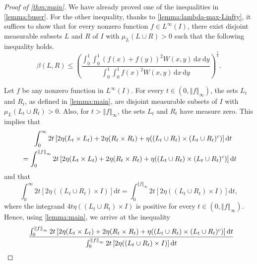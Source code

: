 \documentclass[12pt,a4paper,bold]{thesis}
\theoremstyle{definition}
\newcommand*{\norm}[2][]{\left\Vert #2 \right\Vert_{#1}}
\begin{document}
\begin{proof}[Proof of \cref{thm:main}]
    We have already proved one of the inequalities in \cref{lemma:buser}. 
    For the other inequality, thanks to \cref{lemma:lambda-max-Linfty}, it suffices 
    to show that for every nonzero function $f \in L^{\infty}(I)$, there exist 
    disjoint measurable subsets $L$ and $R$ of $I$ with $\mu_L(L \cup R) > 0$ such that 
    the following inequality holds.
    \begin{equation*}
        \beta(L,R) 
        \leq \left(\frac{\int_0^1 \int_0^1 (f(x) + f(y))^2 W(x,y)\, \mathrm{d}x\, \mathrm{d}y}
        {\int_0^1 \int_0^1 f(x)^2 W(x,y)\, \mathrm{d}x\, \mathrm{d}y}\right)^\frac{1}{2}.
    \end{equation*}

    Let $f$ be any nonzero function in $L^{\infty}(I)$. 
    For every $t \in (0, \norm[\infty]{f})$, the sets $L_t$ and $R_t$, as defined
    in \cref{lemma:main}, are disjoint measurable subsets of $I$ with 
    $\mu_L(L_t \cup R_t) > 0$. Also, for $t > \norm[\infty]{f}$, the sets 
    $L_t$ and $R_t$ have measure zero. This implies that
    \begin{align*}
        & \hspace{0.6cm}
        \int_{0}^{\infty} 2t \left[2 \eta(L_t \times L_t) + 2 \eta(R_t \times R_t)
        + \eta((L_t \cup R_t) \times (L_t \cup R_t)^c)\right] \mathrm{d}t
        \\
        & = 
        \int_{0}^{\norm[\infty]{f}} 2t \left[2 \eta(L_t \times L_t) + 2 \eta(R_t \times R_t)
        + \eta((L_t \cup R_t) \times (L_t \cup R_t)^c)\right] \mathrm{d}t
    \end{align*}
    and that 
    \begin{equation*}
        \int_{0}^{\infty} 2t \left[2 \eta((L_t \cup R_t) \times I)\right] \mathrm{d}t
        = \int_{0}^{\norm[\infty]{f}} 2t \left[2 \eta((L_t \cup R_t) \times I)\right] \mathrm{d}t,
    \end{equation*}
    where the integrand $4t \eta((L_t \cup R_t) \times I)$ is positive for 
    every $t \in (0, \norm[\infty]{f})$. Hence, using \cref{lemma:main}, we arrive
    at the inequality
    \begin{align*}
        & \hspace{0.6cm} \frac{\int_{0}^{\norm[\infty]{f}} 2t \left[2 \eta(L_t \times L_t)
        + 2 \eta(R_t \times R_t) + \eta((L_t \cup R_t) \times (L_t \cup R_t)^c)\right] 
        \mathrm{d}t}{\int_{0}^{\norm[\infty]{f}} 2t \left[2 \eta((L_t \cup R_t) 
        \times I)\right] \mathrm{d}t}

\end{align*}
\end{proof}
\end{document}
